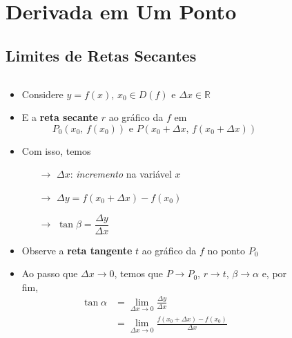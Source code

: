 \section{Derivada em Um Ponto}
\subsection{Limites de Retas Secantes}
\begin{frame}
  \begin{columns}[onlytextwidth]
    \begin{column}{0.5\textwidth}\vspace*{-0.5cm}
      \begin{itemize}
        \item Considere $y=f(x)$, $x_{0}\in D(f)$ e $\Delta x\in\mathbb{R}$
        \item E a \textbf{reta secante} $r$ ao gráfico da $f$ em\vspace{-0.2cm}
        \begin{equation*}
          P_{0}(x_{0},\,f(x_{0})) \mbox{ e } P(x_{0} + \Delta x,\,f(x_{0} + \Delta x))
        \end{equation*}
        \item Com isso, temos
        \begin{itemize}
          \item[$\to$] $\Delta x$: \emph{incremento} na variável $x$
          \item[$\to$] $\Delta y = f(x_0+\Delta x) - f(x_{0})$
          \item[$\to$]  $\tan\beta = \dfrac{\Delta y}{\Delta x}$
        \end{itemize}
        \item Observe a \textbf{reta tangente} $t$ ao gráfico da $f$ no ponto $P_{0}$
        \item Ao passo que $\Delta x \to 0$, temos que $P \to P_{0}$, $r \to t$, $\beta \to \alpha$ e, por fim,
        \begin{equation*}
          \begin{split}
            \tan{\alpha} &= \lim_{\Delta x\to 0}\frac{\Delta y}{\Delta x} \\ &= \lim_{\Delta x\to 0}\frac{f(x_0+\Delta x) - f(x_{0})}{\Delta x}
          \end{split}
        \end{equation*}
      \end{itemize}
    \end{column}
    \begin{column}{0.5\textwidth}\vspace*{-0.5cm}
      \begin{figure}
      \end{figure}
    \end{column}
  \end{columns}
\end{frame}


